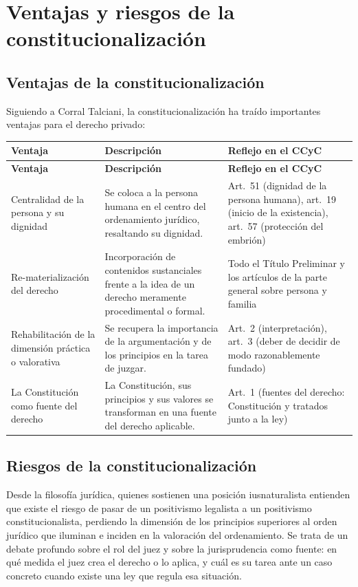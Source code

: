 \documentclass[12pt,oneside]{book}
\begin{document}
\section{Ventajas y riesgos de la constitucionalización}

\subsection{Ventajas de la constitucionalización}

Siguiendo a Corral Talciani, la constitucionalización ha traído importantes ventajas para el derecho privado:

\begin{longtable}{|p{}|p{}|p{}|}
\hline
\textbf{Ventaja} & \textbf{Descripción} & \textbf{Reflejo en el CCyC} \\
\hline
\endfirsthead
\hline
\textbf{Ventaja} & \textbf{Descripción} & \textbf{Reflejo en el CCyC} \\
\hline
\endhead
\hline
\endfoot
\hline
\endlastfoot
Centralidad de la persona y su dignidad & Se coloca a la persona humana en el centro del ordenamiento jurídico, resaltando su dignidad. & Art.\ 51 (dignidad de la persona humana), art.\ 19 (inicio de la existencia), art.\ 57 (protección del embrión) \\
\hline
Re-materialización del derecho & Incorporación de contenidos sustanciales frente a la idea de un derecho meramente procedimental o formal. & Todo el Título Preliminar y los artículos de la parte general sobre persona y familia \\
\hline
Rehabilitación de la dimensión práctica o valorativa & Se recupera la importancia de la argumentación y de los principios en la tarea de juzgar. & Art.\ 2 (interpretación), art.\ 3 (deber de decidir de modo razonablemente fundado) \\
\hline
La Constitución como fuente del derecho & La Constitución, sus principios y sus valores se transforman en una fuente del derecho aplicable. & Art.\ 1 (fuentes del derecho: Constitución y tratados junto a la ley) \\
\hline
\end{longtable}

\subsection{Riesgos de la constitucionalización}

Desde la filosofía jurídica, quienes sostienen una posición iusnaturalista entienden que existe el riesgo de pasar de un positivismo legalista a un positivismo constitucionalista, perdiendo la dimensión de los principios superiores al orden jurídico que iluminan e inciden en la valoración del ordenamiento. Se trata de un debate profundo sobre el rol del juez y sobre la jurisprudencia como fuente: en qué medida el juez crea el derecho o lo aplica, y cuál es su tarea ante un caso concreto cuando existe una ley que regula esa situación.
\end{document}
